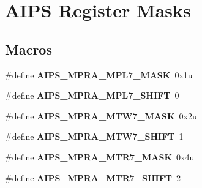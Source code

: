 \hypertarget{group___a_i_p_s___register___masks}{}\section{A\+I\+P\+S Register Masks}
\label{group___a_i_p_s___register___masks}
\subsection*{Macros}
\begin{DoxyCompactItemize}
\item 
\hypertarget{group___a_i_p_s___register___masks_gae5302985c526b9e8f771b3f25d05312b}{}\#define {\bfseries A\+I\+P\+S\+\_\+\+M\+P\+R\+A\+\_\+\+M\+P\+L7\+\_\+\+M\+A\+S\+K}~0x1u\label{group___a_i_p_s___register___masks_gae5302985c526b9e8f771b3f25d05312b}

\item 
\hypertarget{group___a_i_p_s___register___masks_ga47a95f8b33ea2cae493835e28c881da0}{}\#define {\bfseries A\+I\+P\+S\+\_\+\+M\+P\+R\+A\+\_\+\+M\+P\+L7\+\_\+\+S\+H\+I\+F\+T}~0\label{group___a_i_p_s___register___masks_ga47a95f8b33ea2cae493835e28c881da0}

\item 
\hypertarget{group___a_i_p_s___register___masks_gad274bd1ec78e4a351569191168fd5380}{}\#define {\bfseries A\+I\+P\+S\+\_\+\+M\+P\+R\+A\+\_\+\+M\+T\+W7\+\_\+\+M\+A\+S\+K}~0x2u\label{group___a_i_p_s___register___masks_gad274bd1ec78e4a351569191168fd5380}

\item 
\hypertarget{group___a_i_p_s___register___masks_ga894a552c765aa4a6bdc35a28e6010d74}{}\#define {\bfseries A\+I\+P\+S\+\_\+\+M\+P\+R\+A\+\_\+\+M\+T\+W7\+\_\+\+S\+H\+I\+F\+T}~1\label{group___a_i_p_s___register___masks_ga894a552c765aa4a6bdc35a28e6010d74}

\item 
\hypertarget{group___a_i_p_s___register___masks_gaefe8432fdb4fa8b4fa2cdfe6e974b3f7}{}\#define {\bfseries A\+I\+P\+S\+\_\+\+M\+P\+R\+A\+\_\+\+M\+T\+R7\+\_\+\+M\+A\+S\+K}~0x4u\label{group___a_i_p_s___register___masks_gaefe8432fdb4fa8b4fa2cdfe6e974b3f7}

\item 
\hypertarget{group___a_i_p_s___register___masks_ga3062b625c4ad1a66a346816b4df6696e}{}\#define {\bfseries A\+I\+P\+S\+\_\+\+M\+P\+R\+A\+\_\+\+M\+T\+R7\+\_\+\+S\+H\+I\+F\+T}~2\label{group___a_i_p_s___register___masks_ga3062b625c4ad1a66a346816b4df6696e}


\end{DoxyCompactItemize}
